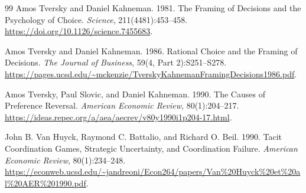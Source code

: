 \documentclass[11pt]{article}
\begin{document}
{\begin{thebibliography}{99}
Amos Tversky and Daniel Kahneman. 1981.
The Framing of Decisions and the Psychology of Choice.
\emph{Science}, 211(4481):453--458.
\url{https://doi.org/10.1126/science.7455683}.

Amos Tversky and Daniel Kahneman. 1986.
Rational Choice and the Framing of Decisions.
\emph{The Journal of Business}, 59(4, Part 2):S251--S278.
\url{https://pages.ucsd.edu/~mckenzie/TverskyKahnemanFramingDecisions1986.pdf}.

Amos Tversky, Paul Slovic, and Daniel Kahneman. 1990.
The Causes of Preference Reversal.
\emph{American Economic Review}, 80(1):204--217.
\url{https://ideas.repec.org/a/aea/aecrev/v80y1990i1p204-17.html}.

John B. Van Huyck, Raymond C. Battalio, and Richard O. Beil. 1990.
Tacit Coordination Games, Strategic Uncertainty, and Coordination Failure.
\emph{American Economic Review}, 80(1):234--248.
\url{https://econweb.ucsd.edu/~jandreoni/Econ264/papers/Van%20Huyck%20et%20al%20AER%201990.pdf}.
\end{thebibliography}
}
\end{document}

